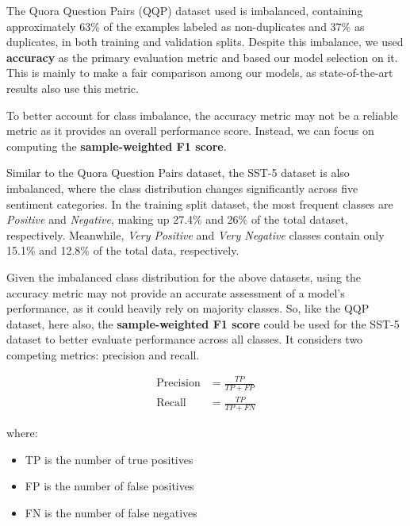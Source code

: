 
The Quora Question Pairs (QQP) dataset used is imbalanced, containing approximately 63\% of the examples labeled as non-duplicates and 37\% as duplicates, in both training and validation splits. Despite this imbalance, we used \textbf{accuracy} as the primary evaluation metric and based our model selection on it. This is mainly to make a fair comparison among our models, as state-of-the-art results also use this metric.

To better account for class imbalance, the accuracy metric may not be a reliable metric as it provides an overall performance score. Instead, we can focus on computing the \textbf{sample-weighted F1 score}.

Similar to the Quora Question Pairs dataset, the SST-5 dataset is also imbalanced, where the class distribution changes significantly across five sentiment categories. In the training split dataset, the most frequent classes are \textit{Positive} and \textit{Negative}, making up 27.4\% and 26\% of the total dataset, respectively. Meanwhile, \textit{Very Positive} and \textit{Very Negative} classes contain only 15.1\% and 12.8\% of the total data, respectively.

Given the imbalanced class distribution for the above datasets, using the accuracy metric may not provide an accurate assessment of a model's performance, as it could heavily rely on majority classes. So, like the QQP dataset, here also, the \textbf{sample-weighted F1 score} could be used for the SST-5 dataset to better evaluate performance across all classes. It considers two competing metrics: precision and recall.

\begin{align*}
\text{Precision} &= \frac{TP}{TP + FP} \\
\text{Recall} &= \frac{TP}{TP + FN}
\end{align*}

\noindent where:
\begin{itemize}
    \item TP is the number of true positives
    \item FP is the number of false positives
    \item FN is the number of false negatives
\end{itemize}

